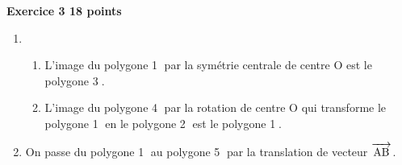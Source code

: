 \documentclass[10pt]{article}
\newcommand{\vect}[1]{\overrightarrow{\,\mathstrut#1\,}}
\begin{document}
\textbf{Exercice 3 \hfill 18 points}

\medskip

%
%

\begin{enumerate}
\item ~

	\begin{enumerate}
		\item %
	L'image du polygone \textcircled{1} par la symétrie centrale de centre O est le polygone \textcircled{3}.
		\item %
L'image du polygone \textcircled{4} par la rotation de centre O qui transforme le polygone \textcircled{1} en le polygone \textcircled{2} est le polygone \textcircled{1}.
	\end{enumerate}
	
\item %

On passe du polygone \textcircled{1} au  polygone \textcircled{5} par la translation de vecteur $\vect{\text{AB}}$.


\end{enumerate}
\end{document}
